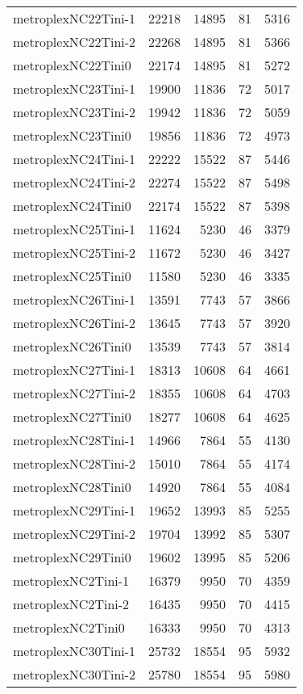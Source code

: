 \begin{longtable}{lrrrr}
metroplexNC22Tini-1 & 22218 & 14895 & 81 & 5316 \\
metroplexNC22Tini-2 & 22268 & 14895 & 81 & 5366 \\
metroplexNC22Tini0 & 22174 & 14895 & 81 & 5272 \\
metroplexNC23Tini-1 & 19900 & 11836 & 72 & 5017 \\
metroplexNC23Tini-2 & 19942 & 11836 & 72 & 5059 \\
metroplexNC23Tini0 & 19856 & 11836 & 72 & 4973 \\
metroplexNC24Tini-1 & 22222 & 15522 & 87 & 5446 \\
metroplexNC24Tini-2 & 22274 & 15522 & 87 & 5498 \\
metroplexNC24Tini0 & 22174 & 15522 & 87 & 5398 \\
metroplexNC25Tini-1 & 11624 & 5230 & 46 & 3379 \\
metroplexNC25Tini-2 & 11672 & 5230 & 46 & 3427 \\
metroplexNC25Tini0 & 11580 & 5230 & 46 & 3335 \\
metroplexNC26Tini-1 & 13591 & 7743 & 57 & 3866 \\
metroplexNC26Tini-2 & 13645 & 7743 & 57 & 3920 \\
metroplexNC26Tini0 & 13539 & 7743 & 57 & 3814 \\
metroplexNC27Tini-1 & 18313 & 10608 & 64 & 4661 \\
metroplexNC27Tini-2 & 18355 & 10608 & 64 & 4703 \\
metroplexNC27Tini0 & 18277 & 10608 & 64 & 4625 \\
metroplexNC28Tini-1 & 14966 & 7864 & 55 & 4130 \\
metroplexNC28Tini-2 & 15010 & 7864 & 55 & 4174 \\
metroplexNC28Tini0 & 14920 & 7864 & 55 & 4084 \\
metroplexNC29Tini-1 & 19652 & 13993 & 85 & 5255 \\
metroplexNC29Tini-2 & 19704 & 13992 & 85 & 5307 \\
metroplexNC29Tini0 & 19602 & 13995 & 85 & 5206 \\
metroplexNC2Tini-1 & 16379 & 9950 & 70 & 4359 \\
metroplexNC2Tini-2 & 16435 & 9950 & 70 & 4415 \\
metroplexNC2Tini0 & 16333 & 9950 & 70 & 4313 \\
metroplexNC30Tini-1 & 25732 & 18554 & 95 & 5932 \\
metroplexNC30Tini-2 & 25780 & 18554 & 95 & 5980 \\

\end{longtable}
